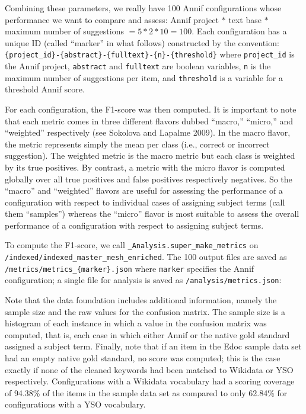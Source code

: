 Combining these parameters, we really have 100 Annif configurations
whose performance we want to compare and assess: Annif project \(*\)
text base \(*\) maximum number of suggestions \(= 5 * 2 * 10 = 100\).
Each configuration has a unique ID (called ``marker'' in what follows)
constructed by the convention:
\texttt{\{project\_id\}-\{abstract\}-\{fulltext\}-\{n\}-\{threshold\}}
where \texttt{project\_id} is the Annif project, \texttt{abstract} and
\texttt{fulltext} are boolean variables, \texttt{n} is the maximum
number of suggestions per item, and \texttt{threshold} is a variable for
a threshold Annif score.

For each configuration, the F1-score was then computed. It is important
to note that each metric comes in three different flavors dubbed
``macro,'' ``micro,'' and ``weighted'' respectively (see Sokolova and
Lapalme 2009). In the macro flavor, the metric represents simply the
mean per class (i.e., correct or incorrect suggestion). The weighted
metric is the macro metric but each class is weighted by its true
positives. By contrast, a metric with the micro flavor is computed
globally over all true positives and false positives respectively
negatives. So the ``macro'' and ``weighted'' flavors are useful for
assessing the performance of a configuration with respect to individual
cases of assigning subject terms (call them ``samples'') whereas the
``micro'' flavor is most suitable to assess the overall performance of a
configuration with respect to assigning subject terms.

To compute the F1-score, we call
\texttt{\_Analysis.super\_make\_metrics} on
\texttt{/indexed/indexed\_master\_mesh\_enriched}. The 100 output files
are saved as \texttt{/metrics/metrics\_\{marker\}.json} where
\texttt{marker} specifies the Annif configuration; a single file for
analysis is saved as \texttt{/analysis/metrics.json}:

\begin{Shaded}
\begin{Highlighting}[]
\OperatorTok{+} \NormalTok{)}
\end{Highlighting}
\end{Shaded}

Note that the data foundation includes additional information, namely
the sample size and the raw values for the confusion matrix. The sample
size is a histogram of each instance in which a value in the confusion
matrix was computed, that is, each case in which either Annif or the
native gold standard assigned a subject term. Finally, note that if an
item in the Edoc sample data set had an empty native gold standard, no
score was computed; this is the case exactly if none of the cleaned
keywords had been matched to Wikidata or YSO respectively.
Configurations with a Wikidata vocabulary had a scoring coverage of
94.38\% of the items in the sample data set as compared to only 62.84\%
for configurations with a YSO vocabulary.

